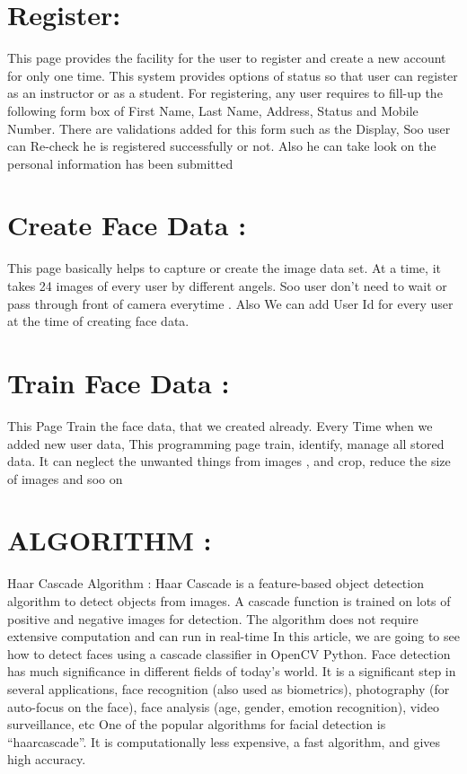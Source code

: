 \section{Register:}

This page provides the facility for the user to register and create a new account for only one time. This system provides
options of status so that user can register as an instructor or as a student. For registering, any user requires to fill-up the
following form box of First Name, Last Name, Address, Status and Mobile Number.
There are validations added for this form such as the Display, Soo user can Re-check he is registered successfully or not.
Also he can take look on the personal information has been submitted
         



\section{Create Face Data :}
This page basically helps to capture or create the image data set. At a time, it takes 24 images of every user by different
angels. Soo user don’t need to wait or pass through front of camera everytime .
Also We can add User Id for every user at the time of creating face data.

\section{Train Face Data :}
This Page Train the face data, that we created already. Every Time when we added new user data, This programming
page train, identify, manage all stored data. It can neglect the unwanted things from images , and crop, reduce the size of
images and soo on



\section{ALGORITHM :}
{Haar Cascade Algorithm :} Haar Cascade is a feature-based object detection algorithm to detect objects from images. A cascade function is trained
on lots of positive and negative images for detection. The algorithm does not require extensive computation and can run
in real-time
In this article, we are going to see how to detect faces using a cascade classifier in OpenCV Python. Face detection has
much significance in different fields of today’s world. It is a significant step in several applications, face recognition
(also used as biometrics), photography (for auto-focus on the face), face analysis (age, gender, emotion recognition),
video surveillance, etc
One of the popular algorithms for facial detection is “haarcascade”. It is computationally less expensive, a fast
algorithm, and gives high accuracy.

